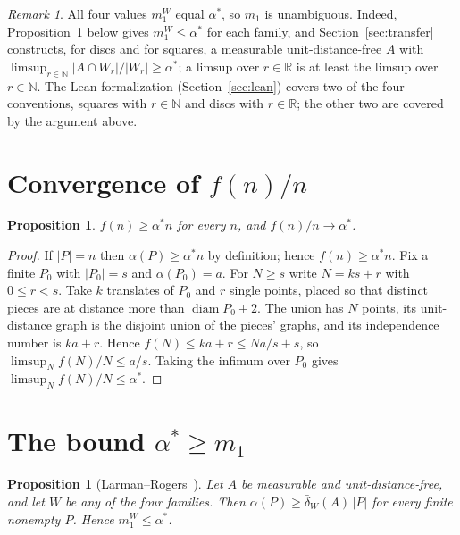 \documentclass[11pt]{amsart}
\newtheorem{proposition}[theorem]{Proposition}
\theoremstyle{definition}
\theoremstyle{remark}
\newtheorem{remark}[theorem]{Remark}
\newcommand{\R}{\mathbb{R}}
\newcommand{\N}{\mathbb{N}}
\newcommand{\dens}{\bar\delta}
\begin{document}
\begin{remark}\label{rem:conventions}
All four values $m_1^W$ equal $\alpha^*$, so $m_1$ is unambiguous. Indeed, Proposition~\ref{prop:LR} below gives $m_1^W\le\alpha^*$ for each family, and Section~\ref{sec:transfer} constructs, for discs and for squares, a measurable unit-distance-free $A$ with $\limsup_{r\in\N}|A\cap W_r|/|W_r|\ge\alpha^*$; a limsup over $r\in\R$ is at least the limsup over $r\in\N$. The Lean formalization (Section~\ref{sec:lean}) covers two of the four conventions, squares with $r\in\N$ and discs with $r\in\R$; the other two are covered by the argument above.
\end{remark}

\section{Convergence of $f(n)/n$}\label{sec:conv}

\begin{proposition}\label{prop:conv}
$f(n)\ge\alpha^*n$ for every $n$, and $f(n)/n\to\alpha^*$.
\end{proposition}

\begin{proof}
If $|P|=n$ then $\alpha(P)\ge\alpha^*n$ by definition; hence $f(n)\ge\alpha^*n$.
Fix a finite $P_0$ with $|P_0|=s$ and $\alpha(P_0)=a$. For $N\ge s$ write $N=ks+r$ with $0\le r<s$. Take $k$ translates of $P_0$ and $r$ single points, placed so that distinct pieces are at distance more than $\operatorname{diam}P_0+2$. The union has $N$ points, its unit-distance graph is the disjoint union of the pieces' graphs, and its independence number is $ka+r$. Hence $f(N)\le ka+r\le Na/s+s$, so $\limsup_Nf(N)/N\le a/s$. Taking the infimum over $P_0$ gives $\limsup_Nf(N)/N\le\alpha^*$.
\end{proof}

\section{The bound $\alpha^*\ge m_1$}\label{sec:LR}

\begin{proposition}[Larman--Rogers~\cite{LR}]\label{prop:LR}
Let $A$ be measurable and unit-distance-free, and let $W$ be any of the four families. Then $\alpha(P)\ge\dens_W(A)\,|P|$ for every finite nonempty $P$. Hence $m_1^W\le\alpha^*$.
\end{proposition}
\end{document}

